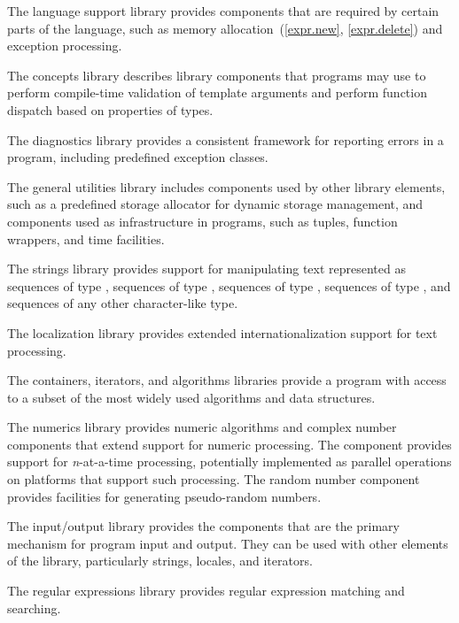 \pnum
The language support library provides components that are
required by certain parts of the \Cpp{} language, such as memory allocation~(\ref{expr.new},
\ref{expr.delete}) and exception processing.

\pnum
The concepts library describes library components that \Cpp{}
programs may use to perform compile-time validation of template arguments and
perform function dispatch based on properties of types.

\pnum
The diagnostics library provides a consistent framework for
reporting errors in a \Cpp{} program, including predefined exception classes.

\pnum
The general utilities library includes components used
by other library elements, such as a predefined storage allocator for dynamic
storage management, and components used
as infrastructure
in \Cpp{} programs,
such as tuples, function wrappers, and time facilities.

\pnum
The strings library provides support for manipulating text represented
as sequences of type
,
sequences of type
,
sequences of type
,
sequences of type
,
and sequences of any other character-like type.

\pnum
The localization library provides extended internationalization
support for text processing.

\pnum
The containers, iterators,
and algorithms libraries provide a \Cpp{} program with access
to a subset of the most widely used algorithms and data structures.

\pnum
The numerics library provides
numeric algorithms and complex number components that extend support for numeric processing.
The
component provides support for
\textit{n}-at-a-time
processing,
potentially implemented as parallel operations on platforms that support such processing.
The random number component provides facilities for generating pseudo-random numbers.

\pnum
The input/output library provides the
components that are the primary mechanism for \Cpp{} program input and output.
They can be used with other elements of the library, particularly
strings, locales, and iterators.

\pnum
The regular expressions library provides regular expression matching and searching.

